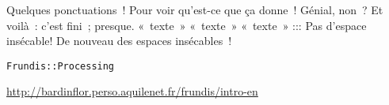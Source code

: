 Quelques ponctuations~! Pour voir qu'est-ce que ça donne~! Génial, non~?
Et voilà~: c'est fini~; presque. 
«~texte~»
«~texte~»
«~texte~»
:::
Pas d'espace insécable!
De nouveau des espaces insécables~!

\begin{verbatim}
Frundis::Processing
\end{verbatim}
\url{http://bardinflor.perso.aquilenet.fr/frundis/intro-en}

